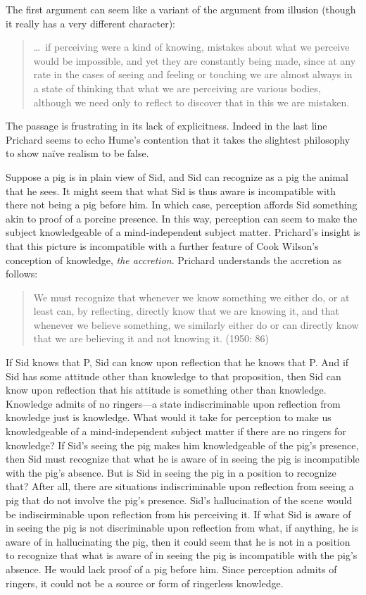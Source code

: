 The first argument can seem like a variant of the argument from illusion (though it really has a very different character): 
\begin{quote}
	\ldots\ if perceiving were a kind of knowing, mistakes about what we perceive would be impossible, and yet they are constantly being made, since at any rate in the cases of seeing and feeling or touching we are almost always in a state of thinking that what we are perceiving are various bodies, although we need only to reflect to discover that in this we are mistaken. \citep[11]{Prichard:1938ve}
\end{quote}
The passage is frustrating in its lack of explicitness. Indeed in the last line Prichard seems to echo Hume’s \citeyearpar[§XII]{Hume:1740lr} contention that it takes the slightest philosophy to show naïve realism to be false. 

Suppose a pig is in plain view of Sid, and Sid can recognize as a pig the animal that he sees. It might seem that what Sid is thus aware is incompatible with there not being a pig before him. In which case, perception affords Sid something akin to proof of a porcine presence. In this way, perception can seem to make the subject knowledgeable of a mind-independent subject matter. Prichard's insight is that this picture is incompatible with a further feature of Cook Wilson's conception of knowledge, \emph{the accretion}. Prichard understands the accretion as follows:
\begin{quote}
	We must recognize that whenever we know something we either do, or at least can, by reflecting, directly know that we are knowing it, and that whenever we believe something, we similarly either do or can directly know that we are believing it and not knowing it. (1950: 86)
\end{quote}
If Sid knows that P, Sid can know upon reflection that he knows that P. And if Sid has some attitude other than knowledge to that proposition, then Sid can know upon reflection that his attitude is something other than knowledge. Knowledge admits of no ringers---a state indiscriminable upon reflection from knowledge just is knowledge. What would it take for perception to make us knowledgeable of a mind-independent subject matter if there are no ringers for knowledge? If Sid's seeing the pig makes him knowledgeable of the pig's presence, then Sid must recognize that what he is aware of in seeing the pig is incompatible with the pig's absence. But is Sid in seeing the pig in a position to recognize that? After all, there are situations indiscriminable upon reflection from seeing a pig that do not involve the pig's presence. Sid's hallucination of the scene would be indiscirminable upon reflection from his perceiving it. If what Sid is aware of in seeing the pig is not discriminable upon reflection from what, if anything, he is aware of in hallucinating the pig, then it could seem that he is not in a position to recognize that what is aware of in seeing the pig is incompatible with the pig's absence. He would lack proof of a pig before him. Since perception admits of ringers, it could not be a source or form of ringerless knowledge.


